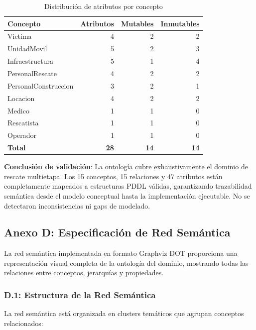\documentclass[conference]{IEEEtran}
\begin{document}
    \begin{table}[H]
    \caption{Distribución de atributos por concepto}
    \label{tab:atributos_concepto}
    \centering
    \small
    \begin{tabular}{@{}lrrr@{}}
    \toprule
    \textbf{Concepto} & \textbf{Atributos} & \textbf{Mutables} & \textbf{Inmutables} \\
    \midrule
    Victima & 4 & 2 & 2 \\
    UnidadMovil & 5 & 2 & 3 \\
    Infraestructura & 5 & 1 & 4 \\
    PersonalRescate & 4 & 2 & 2 \\
    PersonalConstruccion & 3 & 2 & 1 \\
    Locacion & 4 & 2 & 2 \\
    Medico & 1 & 1 & 0 \\
    Rescatista & 1 & 1 & 0 \\
    Operador & 1 & 1 & 0 \\
    \midrule
    \textbf{Total} & \textbf{28} & \textbf{14} & \textbf{14} \\
    \bottomrule
    \end{tabular}
    \end{table}

    \textbf{Conclusión de validación}: La ontología cubre exhaustivamente el dominio de rescate multietapa. Los 15 conceptos, 15 relaciones y 47 atributos están completamente mapeados a estructuras PDDL válidas, garantizando trazabilidad semántica desde el modelo conceptual hasta la implementación ejecutable. No se detectaron inconsistencias ni gaps de modelado.

    \subsection*{Anexo D: Especificación de Red Semántica}

    La red semántica implementada en formato Graphviz DOT proporciona una representación visual completa de la ontología del dominio, mostrando todas las relaciones entre conceptos, jerarquías y propiedades.

    \subsubsection*{D.1: Estructura de la Red Semántica}

    La red semántica está organizada en clusters temáticos que agrupan conceptos relacionados:
\end{document}
